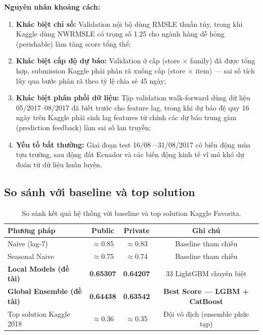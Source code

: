 \documentclass[12pt,a4paper]{report}
\begin{document}
\textbf{Nguyên nhân khoảng cách:}

\begin{enumerate}
    \item \textbf{Khác biệt chỉ số:} Validation nội bộ dùng RMSLE thuần túy, trong khi Kaggle dùng NWRMSLE có trọng số 1.25 cho ngành hàng dễ hỏng (perishable) làm tăng score tổng thể;
    
    \item \textbf{Khác biệt cấp độ dự báo:} Validation ở cấp (store $\times$ family) đã được tổng hợp, submission Kaggle phải phân rã xuống cấp (store $\times$ item) --- sai số tích lũy qua bước phân rã theo tỷ lệ chia sẻ 45 ngày;
    
    \item \textbf{Khác biệt phân phối dữ liệu:} Tập validation walk-forward dùng dữ liệu 05/2017--08/2017 đã biết trước cho feature lag, trong khi dự báo đệ quy 16 ngày trên Kaggle phải sinh lag features từ chính các dự báo trung gian (prediction feedback) làm sai số lan truyền;
    
    \item \textbf{Yếu tố bất thường:} Giai đoạn test 16/08---31/08/2017 có biến động mùa tựu trường, sau động đất Ecuador và các biến động kinh tế vĩ mô khó dự đoán từ dữ liệu huấn luyện.
\end{enumerate}

\subsection{So sánh với baseline và top solution}

\begin{table}[H]
\centering
\small
\begin{tabular}{@{}lccc@{}}
\toprule
\textbf{Phương pháp} & \textbf{Public} & \textbf{Private} & \textbf{Ghi chú} \\
\midrule
Naive (lag-7) & $\approx$0.85 & $\approx$0.83 & Baseline tham chiếu \\
Seasonal Naive & $\approx$0.75 & $\approx$0.74 & Baseline tham chiếu \\
\textbf{Local Models (đề tài)} & \textbf{0.65307} & \textbf{0.64207} & 33 LightGBM chuyên biệt \\
\textbf{Global Ensemble (đề tài)} & \textbf{0.64438} & \textbf{0.63542} & \textbf{Best Score --- LGBM + CatBoost} \\
Top solution Kaggle 2018 & $\approx$0.36 & $\approx$0.35 & Đội vô địch (ensemble phức tạp) \\
\bottomrule
\end{tabular}
\caption{So sánh kết quả hệ thống với baseline và top solution Kaggle Favorita.}
\label{tab:compare}
\end{table}
\end{document}
